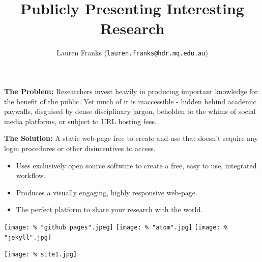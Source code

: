 \documentclass[unknownkeysallowed,usepdftitle=false, aspectratio=169, parskip=full]{beamer}
\title{Publicly Presenting Interesting Research}
\author{Lauren Franks (\texttt{lauren.franks@hdr.mq.edu.au})}
\institute{Macquarie University}
\newcommand{\secvariable}{nothing}
\newcommand{\mysection}[1]{\renewcommand{\secvariable}{#1}
}
\begin{document}
\mysection{abstract}
\begin{frame}\label{\secvariable}



\parbox{\linewidth}{

\textbf{The Problem:} Researchers invest heavily in producing important knowledge for the benefit of the public. Yet much of it is inaccessible - hidden behind academic paywalls, disguised by dense disciplinary jargon, beholden to the whims of social media platforms, or subject to URL hosting fees.  


\vspace{12pt}

\textbf{The Solution:} A static web-page free to create and use that doesn't require any login procedures or other disincentives to access.\\

\begin{itemize}
\item Uses exclusively open source software to create a free, easy to use, integrated workflow.
\item Produces a visually engaging, highly responsive web-page.
\item The perfect platform to share your research with the world.
\end{itemize}

 \vspace{8pt}
 
 \texttt{[image: \%
"github pages".jpeg]}\hspace{.05\textwidth}
\texttt{[image: \%
"atom".jpg]}
\texttt{[image: \%
"jekyll".jpg]}
 \vspace{12pt}
 
}


   
\end{frame}

\begin{frame}\label{\secvariable}
\begin{center}
 
\texttt{[image: \%
site1.jpg]}
\end{center}
\end{frame}
\end{document}
